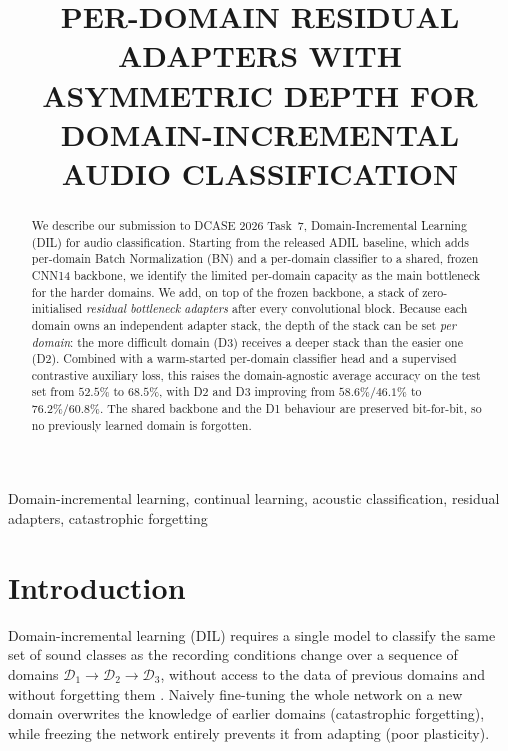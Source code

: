 \documentclass{article}
\title{PER-DOMAIN RESIDUAL ADAPTERS WITH ASYMMETRIC DEPTH FOR\\
DOMAIN-INCREMENTAL AUDIO CLASSIFICATION}
\begin{document}
\ninept
\maketitle

\begin{sloppy}

\begin{abstract}
We describe our submission to DCASE 2026 Task~7, Domain-Incremental Learning
(DIL) for audio classification. Starting from the released ADIL baseline,
which adds per-domain Batch Normalization (BN) and a per-domain classifier
to a shared, frozen CNN14 backbone, we identify the limited per-domain
capacity as the main bottleneck for the harder domains. We add, on top of
the frozen backbone, a stack of zero-initialised \emph{residual bottleneck
adapters} after every convolutional block. Because each domain owns an
independent adapter stack, the depth of the stack can be set
\emph{per domain}: the more difficult domain (D3) receives a deeper stack
than the easier one (D2). Combined with a warm-started per-domain classifier
head and a supervised contrastive auxiliary loss, this raises the
domain-agnostic average accuracy on the test set from $52.5\%$
 to $68.5\%$, with D2 and D3 improving from
$58.6\%/46.1\%$ to $76.2\%/60.8\%$. The shared backbone and the D1 behaviour
are preserved bit-for-bit, so no previously learned domain is forgotten.
\end{abstract}

\begin{keywords}
Domain-incremental learning, continual learning, acoustic
classification, residual adapters, catastrophic forgetting
\end{keywords}


\section{Introduction}
\label{sec:intro}

Domain-incremental learning (DIL) requires a single model to classify the
same set of sound classes as the recording conditions change over a sequence
of domains $\mathcal{D}_1 \rightarrow \mathcal{D}_2 \rightarrow \mathcal{D}_3$,
without access to the data of previous domains and without forgetting them
\cite{mulimani2025dil}. Naively fine-tuning the whole network on a new domain
overwrites the knowledge of earlier domains (catastrophic forgetting), while
freezing the network entirely prevents it from adapting (poor plasticity).


\end{sloppy}
\end{document}
